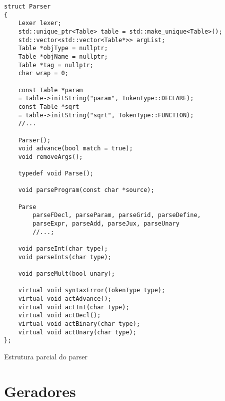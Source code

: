 \documentclass[10pt,a4paper]{article}
\newenvironment{code}{\captionsetup{type=listing}}{}
\begin{document}
\newpage
\begin{code}
\begin{verbatim}
struct Parser
{
    Lexer lexer;
    std::unique_ptr<Table> table = std::make_unique<Table>();
    std::vector<std::vector<Table*>> argList;
    Table *objType = nullptr;
    Table *objName = nullptr;
    Table *tag = nullptr;
    char wrap = 0;
	
    const Table *param
    = table->initString("param", TokenType::DECLARE);
    const Table *sqrt
    = table->initString("sqrt", TokenType::FUNCTION);
    //...

    Parser();
    void advance(bool match = true);
    void removeArgs();

    typedef void Parse();

    void parseProgram(const char *source);

    Parse 
        parseFDecl, parseParam, parseGrid, parseDefine, 
        parseExpr, parseAdd, parseJux, parseUnary
        //...;

    void parseInt(char type);
    void parseInts(char type);

    void parseMult(bool unary);

    virtual void syntaxError(TokenType type);
    virtual void actAdvance();
    virtual void actInt(char type);
    virtual void actDecl();
    virtual void actBinary(char type);
    virtual void actUnary(char type);
};
\end{verbatim}
\caption{Estrutura parcial do parser}
\label{parser}
\end{code}

\newpage
\section{Geradores}
\end{document}
